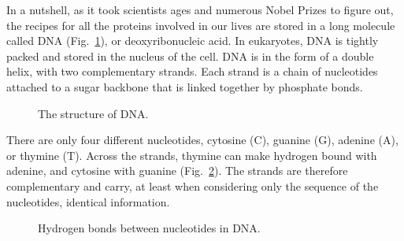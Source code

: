 In a nutshell, as it took scientists ages and numerous Nobel Prizes to figure out, the recipes for all the proteins involved in our lives are stored in a long molecule called DNA (Fig.~\ref{fig:dna-detail}), or deoxyribonucleic acid. In eukaryotes, DNA is tightly packed and stored in the nucleus of the cell. DNA is in the form of a double helix, with two complementary strands. Each strand is a chain of nucleotides attached to a sugar backbone that is linked together by phosphate bonds.

\begin{figure}
    \caption[6pt]{The structure of DNA.}
    \label{fig:dna-detail}
\end{figure}

There are only four different nucleotides, cytosine (C), guanine (G), adenine (A), or thymine (T). Across the strands, thymine can make hydrogen bound with adenine, and cytosine with guanine (Fig.~\ref{fig:tacg-bonds}). The strands are therefore complementary and carry, at least when considering only the sequence of the nucleotides, identical information.

\begin{figure}
    \caption[6pt]{Hydrogen bonds between nucleotides in DNA.}
    \label{fig:tacg-bonds}
\end{figure}

